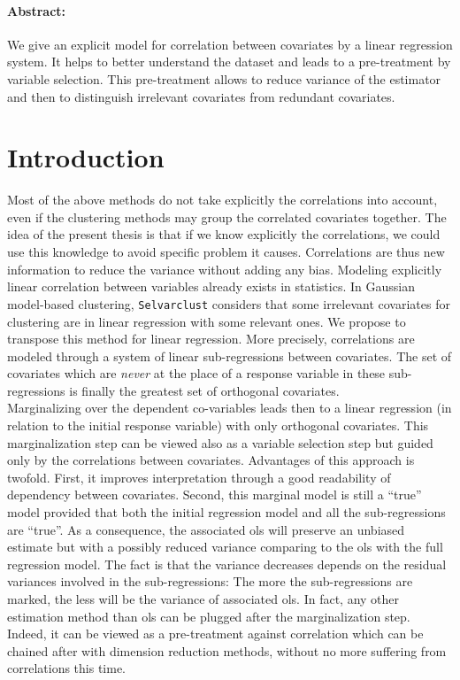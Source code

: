 \documentclass[12pt,a4paper]{report}
\begin{document}
\paragraph{Abstract:} 
We give an explicit model for correlation between covariates by a linear regression system. It helps to better understand the dataset and leads to a pre-treatment by variable selection. This pre-treatment allows to reduce variance of the estimator and then to distinguish irrelevant covariates from redundant covariates.
\\
\section{Introduction}
Most of the above methods do not take explicitly the correlations into account, even if the clustering methods may group the correlated covariates together.
The idea of the present thesis is that if we know explicitly the correlations, we could use this knowledge to avoid specific problem it causes. Correlations are thus new information to reduce the variance without adding any bias. 
Modeling explicitly linear correlation between variables already exists in statistics. In Gaussian model-based clustering, {\tt Selvarclust} \cite{maugis2009variable} considers that some irrelevant covariates for clustering are in linear regression with some relevant ones.
 We propose to transpose this method for linear regression.
More precisely, correlations are modeled through a system of linear sub-regressions between covariates. The set of covariates which are {\it never} at the place of a response variable in these sub-regressions is finally the greatest set of orthogonal covariates.\\

 Marginalizing over the dependent co-variables leads then to a linear regression (in relation to the initial response variable) with only orthogonal covariates. This marginalization step can be viewed also as a variable selection step but guided only by the correlations between covariates. Advantages of this approach is twofold. First, it improves interpretation through a good readability of dependency between covariates. Second, this marginal model is still a ``true'' model provided that both the initial regression model and all the sub-regressions are ``true''. As a consequence, the associated {\sc ols} will preserve an unbiased estimate but with a possibly reduced variance comparing to the {\sc ols} with the full regression model. The fact is that the variance decreases depends on the residual variances involved in the sub-regressions: The more the sub-regressions are marked, the less will be the variance of associated {\sc ols}. In fact, any other estimation method than {\sc ols} can be plugged after the marginalization step. Indeed, it can be viewed as a pre-treatment against correlation which can be chained after with dimension reduction methods, without no more suffering from correlations this time.
\end{document}
